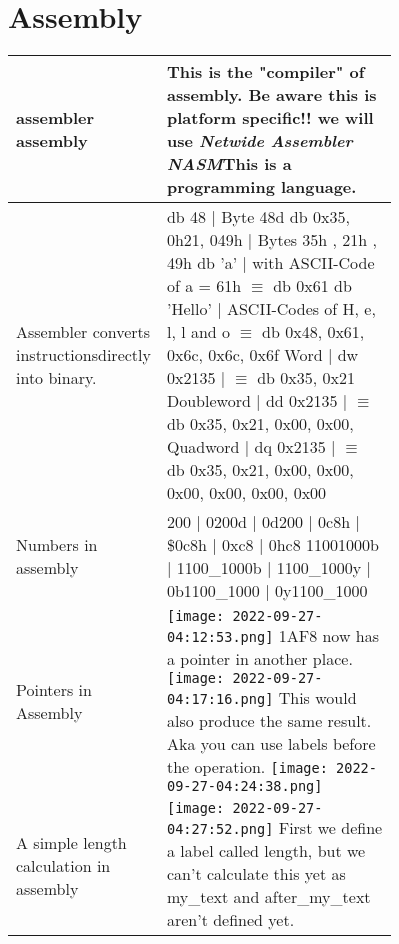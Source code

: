 \documentclass[main.tex,fontsize=8pt,paper=a4,paper=portrait,DIV=calc,]{scrartcl}
\begin{document}
\begin{table}[h!]
\section{Assembly}
\begin{tabular}{|m{0,2\linewidth}|m{0.755\linewidth}|}
\hline
assembler \newline 
assembly & This is the "compiler" of assembly. Be aware this is \textbf{platform specific!!} we will use \emph{Netwide Assembler NASM}\newline This is a programming language.\\
\hline
Assembler converts instructions\newline directly into binary. & db 48 | Byte 48d \newline
db 0x35, 0h21, 049h | Bytes 35h , 21h , 49h \newline
db ’a’ | with ASCII-Code of a = 61h \(\equiv\) db 0x61 \newline
db ’Hello’ | ASCII-Codes of H, e, l, l and o \(\equiv\) db 0x48, 0x61, 0x6c, 0x6c, 0x6f\newline
Word       | dw 0x2135 | \(\equiv\) db 0x35, 0x21\newline
Doubleword | dd 0x2135 | \(\equiv\) db 0x35, 0x21, 0x00, 0x00, \newline 
Quadword   | dq 0x2135 | \(\equiv\) db 0x35, 0x21, 0x00, 0x00, 0x00, 0x00, 0x00, 0x00 \\
\hline
Numbers in assembly & 200 | 0200d | 0d200 | 0c8h | \$0c8h | 0xc8 | 0hc8 \newline
11001000b | 1100\_1000b | 1100\_1000y | 0b1100\_1000 | 0y1100\_1000
\\
\hline
Pointers in Assembly & \vspace{2mm}\texttt{[image: 2022-09-27-04:12:53.png]} \newline
1AF8 now has a pointer in another place. \newline
\texttt{[image: 2022-09-27-04:17:16.png]}\newline
This would also produce the same result. Aka you can use labels before the operation.\newline
\texttt{[image: 2022-09-27-04:24:38.png]}\\
\hline
A simple length calculation in assembly & \vspace{2mm} \texttt{[image: 2022-09-27-04:27:52.png]}\newline 
First we define a label called length, but we can't calculate this yet as my\_text and after\_my\_text aren't defined yet.\newline

\end{tabular}
\end{table}
\end{document}
